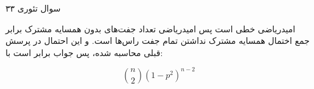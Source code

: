 سوال تئوری ۳۳

امیدریاضی خطی است
پس امیدریاضی تعداد جفت‌های بدون همسایه مشترک
برابر جمع اختمال همسایه مشترک نداشتن تمام جفت راس‌ها است.
و این احتمال در پرسش قبلی محاسبه شده،
پس جواب برابر است با:
    
$$\binom{n}{2}(1-p^2)^{n-2}$$